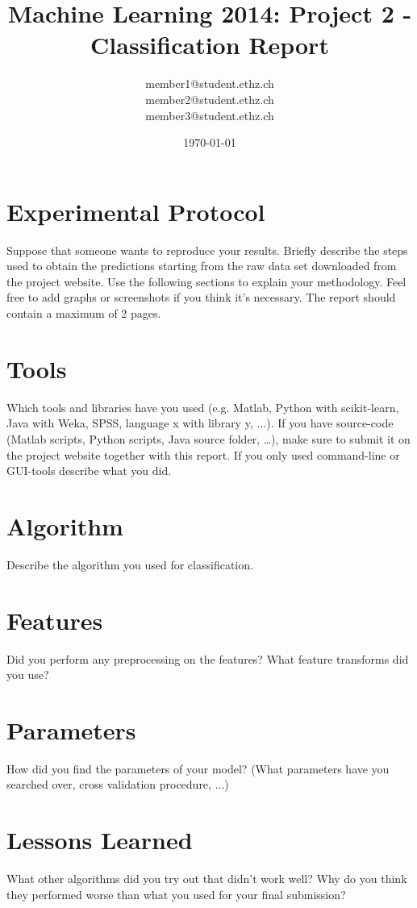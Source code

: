 \documentclass[a4paper, 11pt]{article}
\title{Machine Learning 2014: Project 2 - Classification Report}
\author{member1@student.ethz.ch\\ member2@student.ethz.ch\\ member3@student.ethz.ch\\}
\date{\today}
\begin{document}
\maketitle

\section*{Experimental Protocol}
Suppose that someone wants to reproduce your results. Briefly describe the steps used to obtain the
predictions starting from the raw data set downloaded from the project website. Use the following
sections to explain your methodology. Feel free to add graphs or screenshots if you think it's
necessary. The report should contain a maximum of 2 pages.

\section{Tools}
Which tools and libraries have you used (e.g. Matlab, Python with scikit-learn, Java with Weka,
SPSS, language x with library y, $\ldots$). If you have source-code (Matlab scripts, Python scripts, Java source folder, \dots),
make sure to submit it on the project website together with this report. If you only used
command-line or GUI-tools describe what you did.

\section{Algorithm}
Describe the algorithm you used for classification.

\section{Features}
Did you perform any preprocessing on the features? What feature transforms did you use?

\section{Parameters}
How did you find the parameters of your model? (What parameters have you searched over, cross validation procedure, $\ldots$)

\section{Lessons Learned} What other algorithms did you try out that didn't work well?
Why do you think they performed worse than what you used for your final submission?
\end{document}
